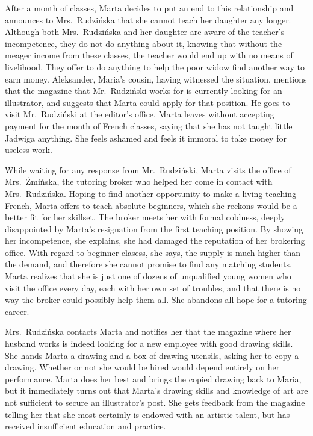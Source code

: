 After a month of classes, Marta decides to put an end to this relationship and announces to Mrs.\ Rudzińska that she cannot teach her daughter any longer.
Although both Mrs.\ Rudzińska and her daughter are aware of the teacher's incompetence, they do not do anything about it, knowing that without the meager income from these classes, the teacher would end up with no means of livelihood.
They offer to do anything to help the poor widow find another way to earn money.
Aleksander, Maria's cousin, having witnessed the situation, mentions that the magazine that Mr.\ Rudziński works for is currently looking for an illustrator, and suggests that Marta could apply for that position.
He goes to visit Mr.\ Rudziński at the editor's office.
Marta leaves without accepting payment for the month of French classes, saying that she has not taught little Jadwiga anything.
She feels ashamed and feels it immoral to take money for useless work.

While waiting for any response from Mr.\ Rudziński, Marta visits the office of Mrs.\ Żmińska, the tutoring broker who helped her come in contact with Mrs.\ Rudzińska.
Hoping to find another opportunity to make a living teaching French, Marta offers to teach absolute beginners, which she reckons would be a better fit for her skillset.
The broker meets her with formal coldness, deeply disappointed by Marta's resignation from the first teaching position.
By showing her incompetence, she explains, she had damaged the reputation of her brokering office.
With regard to beginner clasess, she says, the supply is much higher than the demand, and therefore she cannot promise to find any matching students.
Marta realizes that she is just one of dozens of unqualified young women who visit the office every day, each with her own set of troubles, and that there is no way the broker could possibly help them all.
She abandons all hope for a tutoring career.

Mrs.\ Rudzińska contacts Marta and notifies her that the magazine where her husband works is indeed looking for a new employee with good drawing skills.
She hands Marta a drawing and a box of drawing utensils, asking her to copy a drawing.
Whether or not she would be hired would depend entirely on her performance.
Marta does her best and brings the copied drawing back to Maria, but it immediately turns out that Marta's drawing skills and knowledge of art are not sufficient to secure an illustrator's post.
She gets feedback from the magazine telling her that she most certainly is endowed with an artistic talent, but has received insufficient education and practice.

